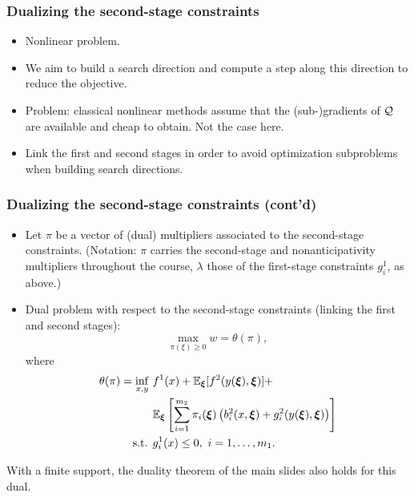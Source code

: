 \documentclass[aspectratio=169]{beamer}
\begin{document}
\begin{frame}
\frametitle{Dualizing the second-stage constraints}

\begin{itemize}
\item
Nonlinear problem.
\item
We aim to build a search direction and compute a step along this direction to reduce the objective.
\item
Problem: classical nonlinear methods assume that the (sub-)gradients of ${\mathcal{Q}}$ are available and cheap to obtain.
Not the case here.
\item
Link the first and second stages in order to avoid optimization subproblems when building search directions.
\end{itemize}

\end{frame}

\begin{frame}
\frametitle{Dualizing the second-stage constraints (cont'd)}

\begin{itemize}
	\item 
Let $\pi$ be a vector of (dual) multipliers associated to the second-stage constraints.
{\footnotesize ({\red Notation}: $\pi$ carries the second-stage and nonanticipativity multipliers throughout the course, $\lambda$ those of the first-stage constraints $g_i^1$, as above.)}
\item
Dual problem with respect to the second-stage constraints (linking the first and second stages):
\[
\max_{\pi(\xi) \geq 0} w = \theta(\pi),
\]
where
\begin{align*}
\theta(\pi) = \inf_{x, y}\ & f^1(x)+{\mathbb{E}}_{{\boldsymbol{\xi}}} [f^2(y({\boldsymbol{\xi}}),{\boldsymbol{\xi}})] + \\
& {\mathbb{E}}_{{\boldsymbol{\xi}}}\left[\sum_{i=1}^{m_2} \pi_i({\boldsymbol{\xi}}) \left( b_i^2(x,{\boldsymbol{\xi}}) +
  g_i^2(y({\boldsymbol{\xi}}), {\boldsymbol{\xi}}) \right) \right] \\
\text{s.t. } & g_i^1(x) \leq 0,\ i=1,\ldots{},m_1.
\end{align*}
\end{itemize}
{\small With a finite support, the duality theorem of the main slides also holds for this dual.}

\end{frame}
\end{document}
